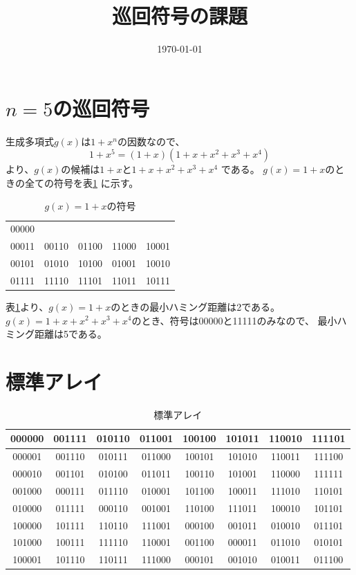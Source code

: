 \documentclass[a4paper,11pt]{jsarticle}
\begin{document}
\title{巡回符号の課題}
\author{}
\date{\today}
\maketitle


\section{$n=5$の巡回符号}
生成多項式$g(x)$は$1+x^n$の因数なので、
\[
  1+x^5=(1+x)(1+x+x^2+x^3+x^4)
\]
より、$g(x)$の候補は$1+x$と$1+x+x^2+x^3+x^4$
である。
$g(x)=1+x$のときの全ての符号を表\ref{table:n5g1}
に示す。
\begin{table}[hbtp]
  \caption{$g(x)=1+x$の符号}
  \label{table:n5g1}
  \centering
  \begin{tabular}{ccccc}
    00000 &&&& \\
    00011 & 00110 & 01100 & 11000 & 10001 \\
    00101 & 01010 & 10100 & 01001 & 10010 \\
    01111 & 11110 & 11101 & 11011 & 10111
  \end{tabular}
\end{table}
表\ref{table:n5g1}より、$g(x)=1+x$のときの最小ハミング距離は2である。
$g(x)=1+x+x^2+x^3+x^4$のとき、符号は00000と11111のみなので、
最小ハミング距離は5である。

\section{標準アレイ}
\begin{table}[hbtp]
  \caption{標準アレイ}
  \label{table:std-array}
  \centering
  \begin{tabular}{c|ccccccc}
    000000 & 001111 &	010110 & 011001	& 100100 & 101011 &	110010 & 111101 \\
    \hline
    000001 & 001110 &	010111 & 011000 &	100101 & 101010	& 110011 & 111100 \\
    000010 & 001101	& 010100 & 011011	& 100110 & 101001 & 110000 & 111111 \\
    001000 & 000111	& 011110 & 010001	& 101100 & 100011	& 111010 & 110101 \\
    010000 & 011111	& 000110 & 001001	& 110100 & 111011 & 100010 & 101101 \\
    100000 & 101111	& 110110 & 111001	& 000100 & 001011	& 010010 & 011101 \\
    101000 & 100111 & 111110 & 110001 & 001100 & 000011 & 011010 & 010101 \\
    100001 & 101110	& 110111 & 111000	& 000101 & 001010	& 010011 & 011100
  \end{tabular}
\end{table}
\end{document}

